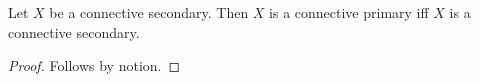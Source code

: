 

\begin{proposition}\label{horn_connective_sibling}
    Let $X$ be a connective secondary.
    Then $X$ is a connective primary iff $X$ is a connective secondary.
\end{proposition}
\begin{proof}
    Follows by notion.
\end{proof}
